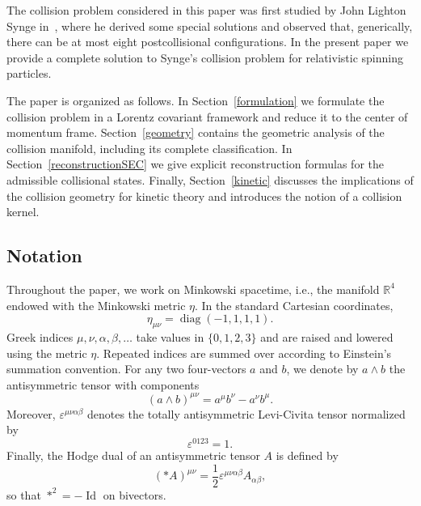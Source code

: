 \documentclass[12pt]{article}
\theoremstyle{plain}
\theoremstyle{definition}
\begin{document}
The collision problem considered in this paper was first studied by John Lighton Synge in~\cite{Synge}, where he derived some special solutions and observed that, generically, there can be at most eight postcollisional configurations. In the present paper we provide a complete solution to Synge's collision problem for relativistic spinning particles.


The paper is organized as follows. In Section~\ref{formulation} we formulate the collision problem in a Lorentz covariant framework and reduce it to the center of momentum frame. Section~\ref{geometry} contains the geometric analysis of the collision manifold, including its complete classification. In Section~\ref{reconstructionSEC} we give explicit reconstruction formulas for the admissible collisional states. Finally, Section~\ref{kinetic} discusses the implications of the collision geometry for kinetic theory and introduces the notion of a collision kernel.

\subsection*{Notation}
Throughout the paper, we work on Minkowski spacetime, i.e., the manifold $\mathbb{R}^{4}$ endowed with the Minkowski metric $\eta$. In the standard Cartesian coordinates,
\[
\eta_{\mu\nu}=\operatorname{diag}(-1,1,1,1).
\]
Greek indices $\mu,\nu,\alpha,\beta,\ldots$ take values in $\{0,1,2,3\}$ and are raised and lowered using the metric $\eta$. Repeated indices are summed over according to Einstein's summation convention. 
For any two four-vectors $a$ and $b$, we denote by $a\wedge b$ the antisymmetric tensor with components
\[
(a\wedge b)^{\mu\nu}
=
a^\mu b^\nu-a^\nu b^\mu.
\]
Moreover, $\varepsilon^{\mu\nu\alpha\beta}$ denotes the totally antisymmetric Levi-Civita tensor normalized by
\[
\varepsilon^{0123}=1.
\]
Finally, the Hodge dual of an antisymmetric tensor $A$ is defined by 
\[ 
(*A)^{\mu\nu} = \frac12 \varepsilon^{\mu\nu\alpha\beta} A_{\alpha\beta}, 
\] 
so that $*^2=-\operatorname{Id}$ on bivectors.
\end{document}
